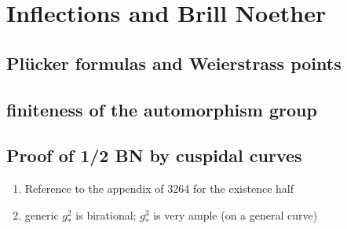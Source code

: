

\chapter{Inflections and Brill Noether}
\label{InflectionsChapter}

\section{ Pl\"ucker formulas and Weierstrass points}
\section{ finiteness of the automorphism group}
\section{Proof of 1/2 BN by cuspidal curves}
\begin{enumerate}
 
\item Reference to the appendix of 3264 for the existence half
\item generic $g^2_*$ is birational; $g^3_*$ is very ample (on a general curve)
\end{enumerate}
